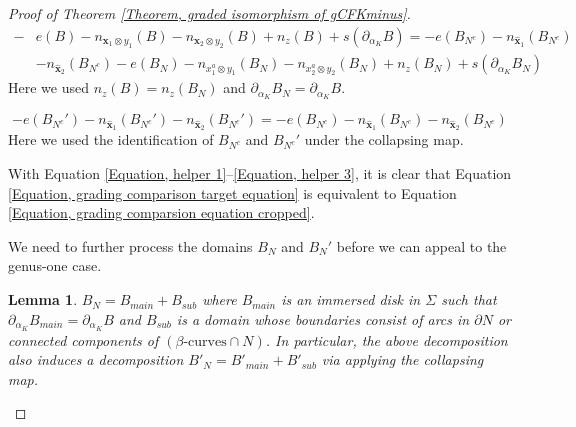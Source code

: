 \documentclass{amsart}
\newtheorem{lem}[thm]{Lemma}
\theoremstyle{definition}
\theoremstyle{remark}
\numberwithin{equation}{section}
\numberwithin{equation}{section} \makeatletter
\begin{document}
\begin{proof}[Proof of Theorem \ref{Theorem, graded isomorphism of gCFKminus}]
\begin{equation}\label{Equation, helper 2}
\begin{aligned}
	-&e(B)-n_{\bm{x}_1\otimes y_1}(B)-n_{\bm{x}_2\otimes y_2}(B)+n_z(B)+s(\partial_{\alpha_{K}}B)=-e(B_{N^c})-n_{\hat{\bm{x}}_1}(B_{N^c})\\
	&-n_{\hat{\bm{x}}_2}(B_{N^c})-e(B_N)-n_{x_1^a \otimes y_1}(B_N)-n_{x_2^a \otimes y_2}(B_N)+n_z(B_N)+s(\partial_{\alpha_{K}}B_N)
\end{aligned}
\end{equation}
Here we used $n_z(B)=n_z(B_N)$ and  $\partial_{\alpha_K}B_N= \partial_{\alpha_K}B$.

\begin{equation}\label{Equation, helper 3}
-e(B_{N^c}')-n_{\hat{\bm{x}}_1}(B_{N^c}')-n_{\hat{\bm{x}}_2}(B_{N^c}')=-e(B_{N^c})-n_{\hat{\bm{x}}_1}(B_{N^c})-n_{\hat{\bm{x}}_2}(B_{N^c})
\end{equation}
Here we used the identification of $B_{N^c}$ and $B_{N^c}'$ under the collapsing map. 

With Equation \ref{Equation, helper 1}--\ref{Equation, helper 3}, it is clear that Equation \ref{Equation, grading comparison target equation} is equivalent to Equation \ref{Equation, grading comparsion equation cropped}.

We need to further process the domains $B_N$ and $B_N'$ before we can appeal to the genus-one case. 

\begin{lem}\label{Lemma, main sub decomposion of the cropped region}
	$B_N=B_{main}+B_{sub}$ where $B_{main}$ is an immersed disk in $\Sigma$ such that $\partial_{\alpha_{K}}B_{main}=\partial_{\alpha_{K}}B$ and $B_{sub}$ is a domain whose boundaries consist of arcs in $\partial N$ or connected components of $(\beta\text{-curves} \cap N)$. In particular, the above decomposition also induces a decomposition $B'_N=B'_{main}+B'_{sub}$ via applying the collapsing map.
\end{lem} 


\end{proof}
\end{document}
